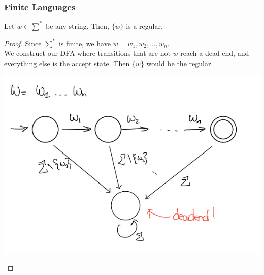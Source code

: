\documentclass{article}
\begin{document}
    \subsubsection{Finite Languages}
    Let $w \in \sum^*$ be any string. Then, $\{w\}$ is a regular.
    \begin{proof}
    Since $\sum^*$ is finite, we have $w = w_1, w_2, ..., w_n$.\\
    We construct our DFA where transitions that are not $w$ reach a dead end, and everything else is the accept state.
    Then $\{w\}$ would be the regular.
    \begin{center}
        \includegraphics[scale=0.5]{imgs/finite-language-regular.png}
    \end{center}
    \end{proof}
    
\end{document}
